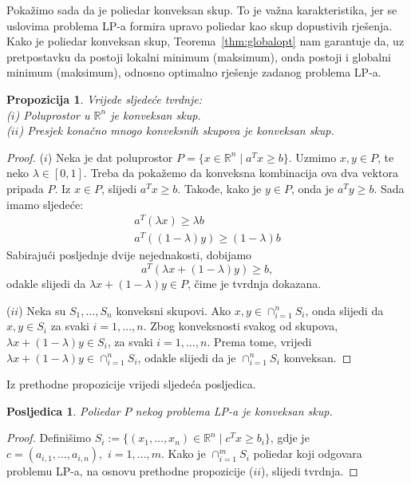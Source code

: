 \documentclass[a4paper, utf8, 11pt, colorlinks]{book}
\newtheorem{prop}{Propozicija}[chapter]
\newtheorem{poslje}{Posljedica}[chapter]
\theoremstyle{definition}
\begin{document}
Pokažimo sada da je poliedar konveksan skup. To je važna karakteristika, jer se uslovima problema LP-a formira upravo poliedar kao skup dopustivih rješenja. Kako je poliedar konveksan skup, Teorema~\ref{thm:globalopt} nam garantuje da, uz pretpostavku da postoji lokalni minimum (maksimum), onda postoji  i globalni minimum (maksimum), odnosno optimalno rješenje zadanog problema LP-a. 

\begin{prop} Vrijede sljedeće tvrdnje: \\
  ($i$)  Poluprostor u $\mathbb{R}^n$ je konveksan skup.  \\
  ($ii$) Presjek konačno mnogo konveksnih skupova je konveksan skup. 
\end{prop}

\begin{proof}
  ($i$) Neka je dat poluprostor $P = \{ x \in \mathbb{R}^n \mid a^T x \geq b \}$. Uzmimo $x, y \in P$, te neko $\lambda \in [0, 1]$. Treba da pokažemo da konveksna kombinacija ova dva vektora   pripada $P$. Iz $x \in P$, slijedi  $a^T x \geq b$. Takođe, kako je $y \in P$, onda  je  $a^T y \geq b$. 
  Sada  imamo sljedeće:
  \begin{align}
      a^T (\lambda x) \geq \lambda b \\
      a^T ((1-\lambda) y) \geq (1-\lambda) b 
  \end{align}
  Sabirajući posljednje dvije nejednakosti, dobijamo 
  \begin{equation}
      a^T( \lambda x + (1 - \lambda) y ) \geq b,
  \end{equation}
  odakle slijedi da $\lambda x + (1-\lambda) y \in P$, čime je tvrdnja dokazana.
  
  ($ii$) Neka su $S_1,\ldots, S_n$ konveksni skupovi. Ako $x,y \in \cap_{i=1}^n S_i$, onda slijedi da $x,y \in S_i$ za svaki $i=1,\ldots,n$. Zbog konveksnosti svakog od skupova,  
  $\lambda x + (1 - \lambda) y \in S_i$, za svaki $i=1,\ldots,n$. Prema tome, vrijedi $ \lambda x + (1-\lambda) y \in \cap_{i=1}^n S_i$, odakle slijedi da je $\cap_{i=1}^n S_i$ konveksan. 
\end{proof}

Iz prethodne propozicije vrijedi sljedeća posljedica.

\begin{poslje}
Poliedar $P$ nekog problema LP-a je konveksan skup.	
\end{poslje}
 
\begin{proof}
  Definišimo $S_i:= \{(x_1,\ldots, x_n) \in \mathbb{R}^n \mid c^T x \geq b_i \}$, gdje je  $c = (a_{i,1}, \ldots, a_{i, n}),$  $ i=1,\ldots, m$. Kako je $\cap_{i=1}^m S_i$ poliedar koji odgovara problemu LP-a, na osnovu prethodne propozicije ($ii$), slijedi tvrdnja. 
\end{proof}
\end{document}
